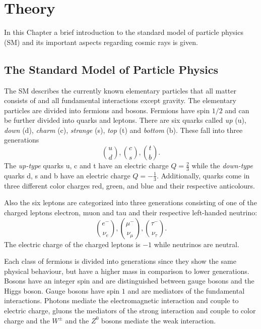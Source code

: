 \section{Theory}\label{sec:Theory}
In this Chapter a brief introduction to the standard model of particle physics (SM) and its important aspects regarding cosmic rays is given.

\subsection{The Standard Model of Particle Physics}
The SM \cite{griffiths} describes the currently known elementary particles that all matter consists of and all fundamental interactions except gravity.
The elementary particles are divided into fermions and bosons.
Fermions have spin $1/2$ and can be further divided into quarks and leptons.
There are six quarks called \textit{up} (u), \textit{down} (d), \textit{charm} (c), \textit{strange} (s), \textit{top} (t) and \textit{bottom} (b).
These fall into three generations
\begin{equation*}
  \binom{u}{d},\binom{c}{s},\binom{t}{b}.
\end{equation*}
The \textit{up-type} quarks u, c and t have an electric charge $Q = \frac{2}{3}$ while the \textit{down-type} quarks d, s and b have an electric charge $Q = - \frac{1}{3}$.
Additionally, quarks come in three different color charges red, green, and blue and their respective anticolours.

Also the six leptons are categorized into three generations consisting of one of the charged leptons electron, muon and tau and their respective left-handed neutrino:
\begin{equation*}
  \binom{e^-}{\nu_e},\binom{\mu^-}{\nu_\mu},\binom{\tau^-}{\nu_\tau}.
\end{equation*}
The electric charge of the charged leptons is $\num{-1}$ while neutrinos are neutral.

Each class of fermions is divided into generations since they show the same physical behaviour, but have a higher mass in comparison to lower generations.\\

Bosons have an integer spin and are distinguished between gauge bosons and the Higgs boson.
Gauge bosons have spin $1$ and are mediators of the fundamental interactions. Photons mediate the electromagnetic interaction and couple to electric charge, gluons the mediators of the strong interaction and couple to color charge and the $W^{\pm}$ and the $Z^0$ bosons mediate the weak interaction.

